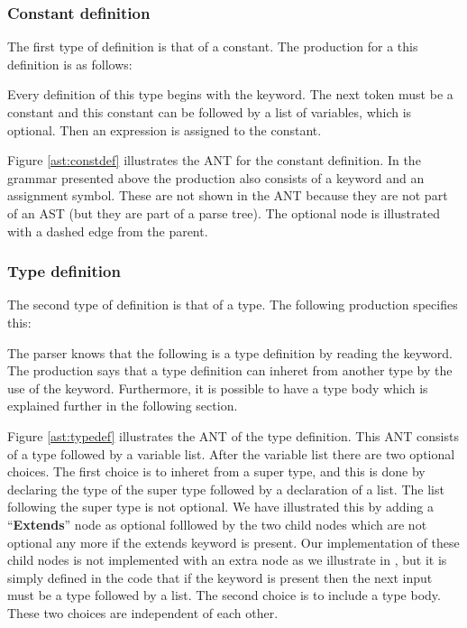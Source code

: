 \subsubsection{Constant definition}
The first type of definition is that of a constant. The production for a
this definition is as follows:

\begin{ebnf}
\end{ebnf}

Every definition of this type begins with the  keyword. The next
token must be a constant and this constant can be followed by a list of
variables, which is optional. Then an expression is assigned to the constant.



Figure \ref{ast:constdef} illustrates the ANT for the constant definition. In
the grammar presented above the production also consists of a keyword and an
assignment symbol. These are not shown in the ANT because they are not part 
of an AST (but they are part of a parse tree). The optional node is illustrated 
with a dashed edge from the parent.

\subsubsection{Type definition}
\label{ap:typedef}

The second type of definition is that of a type. The following production
specifies this:

\begin{ebnf}
\end{ebnf}

The parser knows that the following is a type definition by reading the
 keyword. The production says that a type definition can inheret from
another type by the use of the  keyword. Furthermore, it is
possible to have a type body which is explained further in the following
section.



Figure \ref{ast:typedef} illustrates the ANT of the type
definition. This ANT consists of a type followed by a variable
list. After the variable list there are two optional choices. The first choice
is to inheret from a super type, and this is done by declaring the type of the super
type followed by a declaration of a list. The list following the super type is
not optional. We have illustrated this by adding a ``\textbf{Extends}'' node as
optional folllowed by the two child nodes which are not optional any more if the
extends keyword is present. Our implementation of these child nodes is not
implemented with an extra node as we illustrate in , but it 
is simply defined in the code that if the
keyword is present then the next input must be a type followed by a list.
The second choice is to include a type body. These two choices are independent
of each other.

